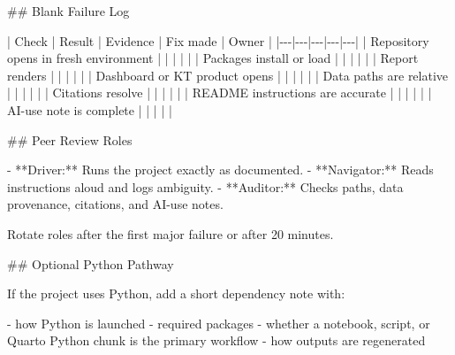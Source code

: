 \documentclass[
  letterpaper,
  DIV=11,
  numbers=noendperiod,
  oneside]{scrreprt}
\newenvironment{Shaded}{\begin{snugshade}}{\end{snugshade}}
\newcommand{\FunctionTok}[1]{\textcolor[rgb]{0.28,0.35,0.67}{#1}}
\newcommand{\NormalTok}[1]{\textcolor[rgb]{0.00,0.23,0.31}{#1}}
\newcommand{\PreprocessorTok}[1]{\textcolor[rgb]{0.68,0.00,0.00}{#1}}
\newcommand{\SpecialStringTok}[1]{\textcolor[rgb]{0.13,0.47,0.30}{#1}}
\begin{document}
\begin{Shaded}
\begin{Highlighting}[numbers=left,,]
\FunctionTok{\#\# Blank Failure Log}

\PreprocessorTok{|}\NormalTok{ Check }\PreprocessorTok{|}\NormalTok{ Result }\PreprocessorTok{|}\NormalTok{ Evidence }\PreprocessorTok{|}\NormalTok{ Fix made }\PreprocessorTok{|}\NormalTok{ Owner }\PreprocessorTok{|}
\PreprocessorTok{|{-}{-}{-}|{-}{-}{-}|{-}{-}{-}|{-}{-}{-}|{-}{-}{-}|}
\PreprocessorTok{|}\NormalTok{ Repository opens in fresh environment }\PreprocessorTok{|}  \PreprocessorTok{|}  \PreprocessorTok{|}  \PreprocessorTok{|}  \PreprocessorTok{|}
\PreprocessorTok{|}\NormalTok{ Packages install or load }\PreprocessorTok{|}  \PreprocessorTok{|}  \PreprocessorTok{|}  \PreprocessorTok{|}  \PreprocessorTok{|}
\PreprocessorTok{|}\NormalTok{ Report renders }\PreprocessorTok{|}  \PreprocessorTok{|}  \PreprocessorTok{|}  \PreprocessorTok{|}  \PreprocessorTok{|}
\PreprocessorTok{|}\NormalTok{ Dashboard or KT product opens }\PreprocessorTok{|}  \PreprocessorTok{|}  \PreprocessorTok{|}  \PreprocessorTok{|}  \PreprocessorTok{|}
\PreprocessorTok{|}\NormalTok{ Data paths are relative }\PreprocessorTok{|}  \PreprocessorTok{|}  \PreprocessorTok{|}  \PreprocessorTok{|}  \PreprocessorTok{|}
\PreprocessorTok{|}\NormalTok{ Citations resolve }\PreprocessorTok{|}  \PreprocessorTok{|}  \PreprocessorTok{|}  \PreprocessorTok{|}  \PreprocessorTok{|}
\PreprocessorTok{|}\NormalTok{ README instructions are accurate }\PreprocessorTok{|}  \PreprocessorTok{|}  \PreprocessorTok{|}  \PreprocessorTok{|}  \PreprocessorTok{|}
\PreprocessorTok{|}\NormalTok{ AI{-}use note is complete }\PreprocessorTok{|}  \PreprocessorTok{|}  \PreprocessorTok{|}  \PreprocessorTok{|}  \PreprocessorTok{|}

\FunctionTok{\#\# Peer Review Roles}

\SpecialStringTok{{-} }\NormalTok{**Driver:** Runs the project exactly as documented.}
\SpecialStringTok{{-} }\NormalTok{**Navigator:** Reads instructions aloud and logs ambiguity.}
\SpecialStringTok{{-} }\NormalTok{**Auditor:** Checks paths, data provenance, citations, and AI{-}use notes.}

\NormalTok{Rotate roles after the first major failure or after 20 minutes.}

\FunctionTok{\#\# Optional Python Pathway}

\NormalTok{If the project uses Python, add a short dependency note with:}

\SpecialStringTok{{-} }\NormalTok{how Python is launched}
\SpecialStringTok{{-} }\NormalTok{required packages}
\SpecialStringTok{{-} }\NormalTok{whether a notebook, script, or Quarto Python chunk is the primary workflow}
\SpecialStringTok{{-} }\NormalTok{how outputs are regenerated}


\end{Highlighting}
\end{Shaded}
\end{document}
